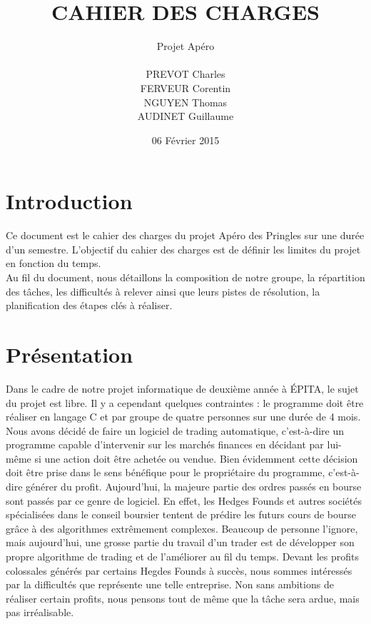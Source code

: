 \documentclass[a4paper,12pt]{article}
\title{CAHIER DES CHARGES}
\author{Projet Apéro \\ \\ PREVOT Charles \\ FERVEUR Corentin \\ 
NGUYEN Thomas \\ AUDINET Guillaume}
\date{06 Février 2015}
\begin{document}
\begin{titlepage}
\maketitle
\end{titlepage}

\tableofcontents
\newpage

\section{Introduction}
Ce document est le cahier des charges du projet Apéro des Pringles sur une durée d'un semestre.
L'objectif du cahier des charges est de définir les limites du projet en fonction du temps. \\

Au fil du document, nous détaillons la composition de notre groupe, la répartition des tâches, les difficultés à relever ainsi que leurs pistes de résolution, la planification des étapes clés à réaliser.\\

\section{Présentation}
Dans le cadre de notre projet informatique de deuxième année à ÉPITA, le sujet du projet est libre. Il y a cependant quelques contraintes : le programme doit être réaliser en langage C et par groupe de quatre personnes sur une durée de 4 mois. Nous avons décidé de faire un logiciel de trading automatique, c'est-à-dire un programme capable d'intervenir sur les marchés finances en décidant par lui-même si une action doit être achetée ou vendue. Bien évidemment cette décision doit être prise dans le sens bénéfique pour le propriétaire du programme, c'est-à-dire générer du profit. Aujourd'hui, la majeure partie des ordres passés en bourse sont passés par ce genre de logiciel. En effet, les Hedges Founds et autres sociétés spécialisées dans le conseil boursier tentent de prédire les futurs cours de bourse grâce à des algorithmes extrêmement complexes. Beaucoup de personne l'ignore, mais aujourd'hui, une grosse partie du travail d'un trader est de développer son propre algorithme de trading et de l'améliorer au fil du temps. Devant les profits colossales générés par certains Hegdes Founds à succès, nous sommes intéressés par la difficultés que représente une telle entreprise. Non sans ambitions de réaliser certain profits, nous pensons tout de même que la tâche sera ardue, mais pas irréalisable.
\end{document}
